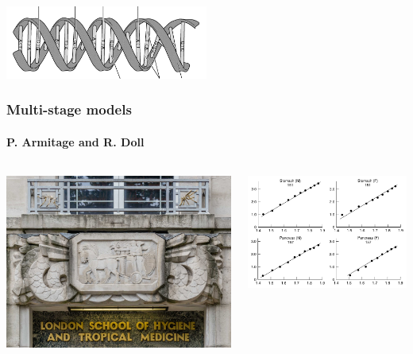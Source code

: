\documentclass{beamer}
\begin{document}
\begin{frame}
\begin{columns}
\begin{column}{0.5\textwidth}
        \end{column}
    \end{columns}
    \begin{center}
    \includegraphics[width=0.5\textwidth]{figures/dna.png}
    \end{center}
\end{frame}

\begin{frame}
    \frametitle{Multi-stage models}
    \framesubtitle{P. Armitage and R. Doll\footnotemark[12]}

    \begin{columns}
        \begin{column}{0.5\textwidth}
        \includegraphics[width=\textwidth]{figures/LSHTM-small.jpg}
        \end{column}
        \begin{column}{0.5\textwidth}
        \includegraphics[width=\textwidth]{figures/PArmitageRDoll_1954_6602297.pdf}
        \end{column}
    \end{columns}



\end{frame}
\end{document}
